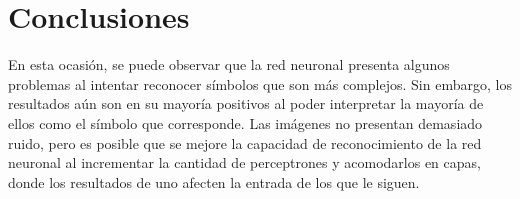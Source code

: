 \documentclass{report}
\begin{document}
\section{Conclusiones}

En esta ocasi\'on, se puede observar que la red neuronal presenta algunos problemas al intentar reconocer s\'imbolos que son m\'as complejos. Sin embargo, los resultados a\'un son en su mayor\'ia positivos al poder interpretar la mayor\'ia de ellos como el s\'imbolo que corresponde. Las im\'agenes no presentan demasiado ruido, pero es posible que se mejore la capacidad de reconocimiento de la red neuronal al incrementar la cantidad de perceptrones y acomodarlos en capas, donde los resultados de uno afecten la entrada de los que le siguen.



\end{document}
